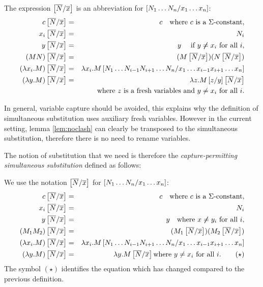 \begin{dfn}
\label{dnf:simsubst}
 The expression $\left[ \overline{N}/\overline{x} \right]$ is an abbreviation for $\left[ N_1 \ldots N_n/x_1
\ldots x_n \right]$:
\begin{eqnarray*}
c \left[ \overline{N}/\overline{x} \right] &=& c \quad \mbox{where $c$ is a $\Sigma$-constant},\\
x_i \left[ \overline{N}/\overline{x} \right] &=& N_i\\
 y \left[ \overline{N}/\overline{x} \right] &=& y \quad \mbox{ if } y \not \neq x_i \mbox{ for all } i,\\
(M N) \left[ \overline{N}/\overline{x} \right] &=& (M \left[ \overline{N}/\overline{x} \right]) (N \left[ \overline{N}/\overline{x} \right]) \\
(\lambda x_i . M) \left[ \overline{N}/\overline{x} \right] &=& \lambda x_i
. M
\left[ N_1 \ldots N_{i-1} N_{i+1}\ldots N_n/x_1 \ldots x_{i-1} x_{i+1}\ldots x_n \right] \\
(\lambda y . M)
\left[ \overline{N}/\overline{x} \right] &=& \lambda z . M \left[ z/y \right] \left[ \overline{N}/\overline{x} \right] \\
&& \mbox{where $z$ is a fresh variables and } y \neq x_i \mbox{ for
all } i.
\end{eqnarray*}
\end{dfn}

In general, variable capture should be avoided, this explains why
the definition of simultaneous substitution uses auxiliary fresh
variables. However in the current setting, lemma \ref{lem:noclash}
can clearly be transposed to the simultaneous substitution,
therefore there is no need to rename variables.

The notion of substitution that we need is therefore the
\emph{capture-permitting simultaneous substitution} defined as
follows:

\begin{dfn}
 We use the notation
$\left[ \overline{N}/\overline{x} \right]$ for $\left[ N_1 \ldots N_n/x_1
\ldots x_n \right]$:
\begin{eqnarray*}
c \left[ \overline{N}/\overline{x} \right] &=& c \quad \mbox{where $c$ is a $\Sigma$-constant},\\
 x_i \left[ \overline{N}/\overline{x} \right] &=& N_i\\
 y \left[ \overline{N}/\overline{x} \right] &=& y \quad \mbox{where } x \not \neq y_i \mbox{ for all } i,\\
(M_1 M_2) \left[ \overline{N}/\overline{x} \right] &=& (M_1 \left[ \overline{N}/\overline{x} \right]) (M_2 \left[ \overline{N}/\overline{x} \right])\\
(\lambda x_i . M) \left[ \overline{N}/\overline{x} \right] &=& \lambda x_i
. M
\left[ N_1 \ldots N_{i-1} N_{i+1}\ldots N_n/x_1 \ldots x_{i-1} x_{i+1}\ldots x_n \right] \\
(\lambda y . M) \left[ \overline{N}/\overline{x} \right] &=& \lambda y . M
\left[ \overline{N}/\overline{x} \right] \mbox{where $y \not = x_i$ for
all $i$}. \qquad \mathbf{(\star)}
\end{eqnarray*}
The symbol $\mathbf{(\star)}$ identifies the equation which has
changed compared to the previous definition.
\end{dfn}


